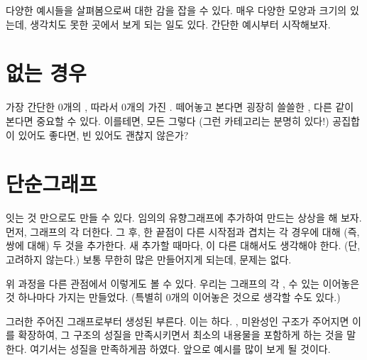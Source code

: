 
\lettrine[lhang=0.17]{다}{양한 예시들을} 살펴봄으로써  대한 감을 잡을 수 있다.
매우 다양한 모양과 크기의 \trCategory\가 있는데, 생각치도 못한 곳에서 \trCategory\를 보게 되는 일도 있다.
간단한 예시부터 시작해보자.

\section{\trObject\가 없는 경우}

가장 간단한 \trCategory\은 0개의 \trObject, 따라서 0개의 \trMorphism\을 가진 \trCategory{}. 
떼어놓고 본다면 굉장히 쓸쓸한 , 다른 \trCategory\와 같이 본다면 중요할 수 있다.
이를테면, 모든   그렇다 (그런 카테고리는 분명히 있다!)
공집합이 있어도 좋다면, 빈 \trCategory\가 있어도 괜찮지 않은가?

\section{단순그래프}

\trObject\를 \trArrow\로 잇는 것 만으로도 \trCategory\를 만들 수 있다.
임의의 유향그래프에 \trArrow\를 추가하여 \trCategory\를 만드는 상상을 해 보자.
먼저, 그래프의 각  \trIdentity  \trArrow\를 더한다. 
그 후, 한  끝점이 다른  시작점과 겹치는 각 경우에 대해
(즉, \trComposition{} 쌍에 대해) 두 \trArrow\를  것을 추가한다.
새 \trArrow\를 추가할 때마다, 이 \trArrow\와 다른   대해서도 생각해야 한다.
(단, \trIdentity  \trArrow\는 고려하지 않는다.)
보통 무한히 많은 \trArrow\가 만들어지게 되는데, 문제는 없다.

위 과정을 다른 관점에서 이렇게도 볼 수 있다. 우리는 그래프의 각  \trObject\를, 
 수 있는 \trEdge\을 이어놓은 것 하나마다 \trMorphism\를 가지는 \trCategory\를 만들었다.
(\trIdentityMorphism\은 특별히 0개의 \trEdge\을 이어놓은 것으로 생각할 수도 있다.)

그러한 \trCategory\는 주어진 그래프로부터 생성된 \trFreeCategory{} 부른다.
이는   하다. , 
미완성인 구조가 주어지면 이를 확장하여, 그 구조의 성질을 만족시키면서 최소의 내용물을 포함하게 하는 것을 말한다. %
여기서는  성질을 만족하게끔 하였다. 
앞으로  예시를 많이 보게 될 것이다.

\section{\trOrder}

